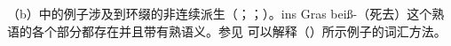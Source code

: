 \begin{exe}
\begin{xlist}[iv.]
\begin{exe}
\begin{xlist}[iv.]
\zl
（b）中的例子涉及到环缀\gee 的非连续派生（\citealp[\S~3.4.3]{Luedeling2001a}；\citealp[--327, 372--377]{Mueller2002b}；\citealp[\S~2.2.1, \S~5.2.1]{Mueller2003a}）。ins Gras beiß-（死去）这个熟语的各个部分都存在并且带有熟语义。参见 可以解释（）所示例子的词汇方法。





\end{xlist}
\end{exe}
\end{xlist}
\end{exe}
